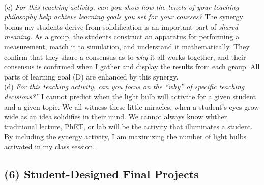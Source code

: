 \documentclass[../../../main.tex]{subfiles}
\begin{document}
\\
\vspace{0.25cm}
(c) \textit{For this teaching activity, can you show how the tenets of your teaching philosophy help achieve learning goals you
set for your courses?}  The synergy bonus my students derive from solidification is an important part of \textit{shared meaning.}  As a group, the students construct an apparatus for performing a measurement, match it to simulation, and understand it mathematically.  They confirm that they share a consensus as to \textit{why} it all works together, and their consensus is confirmed when I gather and display the results from each group.  All parts of learning goal (D) are enhanced by this synergy.
\\
\vspace{0.25cm}
(d) \textit{For this teaching activity, can you focus on the ``why'' of specific teaching decisions?''} I cannot predict when the light bulb will activate for a given student and a given topic.  We all witness these little miracles, when a student's eyes grow wide as an idea solidifies in their mind.  We cannot always know whther traditional lecture, PhET, or lab will be the activity that illuminates a student.  By including the synergy activity, I am maximizing the number of light bulbs activated in my class session.

\subsection{(6) Student-Designed Final Projects}
\end{document}
